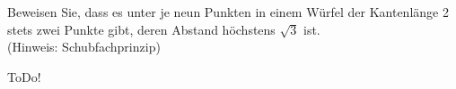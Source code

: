
\begin{exercise}

Beweisen Sie, dass es unter je neun Punkten in einem Würfel der Kantenlänge 2 stets
zwei Punkte gibt, deren Abstand höchstens $\sqrt{3}$ ist. \\
(Hinweis: Schubfachprinzip)
\end{exercise}


\begin{solution}

ToDo!

\end{solution}

